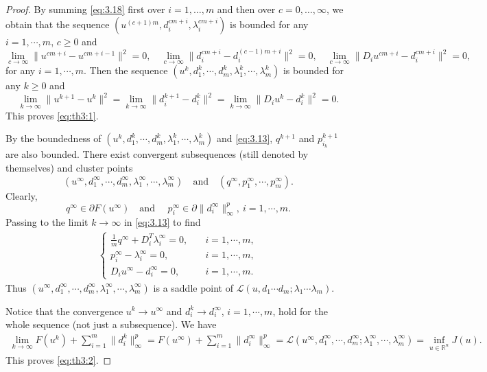 \documentclass{article}
\theoremstyle{definition}
\begin{document}
\begin{proof}
By summing \eqref{eq:3.18} first over $i = 1, \dots, m$ and then over $c = 0, \dots, \infty$,
we obtain that the sequence $(u^{(c+1)m}, d_i^{cm+i}, \lambda_i^{cm+i})$ is bounded for any $i=1,\cdots,m$, $c\geq 0$
and
\[
\lim_{c\rightarrow\infty}\|u^{cm+i}-u^{cm+i-1}\|^2=0,\quad
\lim_{c\rightarrow\infty}\|d_{i}^{cm+i}-d_{i}^{(c-1)m+i}\|^2=0,\quad
\lim_{c\rightarrow\infty}\|D_{i}u^{cm+i}-d_{i}^{cm+i}\|^2=0,
\]
for any $i=1,\cdots,m$.
Then the sequence $(u^k, d_1^k,\cdots, d_m^k,\lambda_1^k,\cdots,\lambda_m^k)$ is bounded for any $k\geq 0$ and
\[
\lim_{k\rightarrow\infty}\|u^{k+1}-u^{k}\|^2
    =\lim_{k\rightarrow\infty}\|d_i^{k+1}-d_i^{k}\|^2
    =\lim_{k\rightarrow\infty}\|D_iu^{k}-d_i^k\|^2
    =0.
\]
This proves \eqref{eq:th3:1}.

By the boundedness of $(u^k, d_1^k,\cdots, d_m^k,\lambda_1^k,\cdots,\lambda_m^k)$ and \eqref{eq:3.13}, $q^{k+1}$ and $p_{i_k}^{k+1}$ are also bounded.
There exist convergent subsequences (still denoted by themselves) and cluster points
\[
(u^\infty, d_1^\infty, \cdots, d_m^\infty, \lambda_1^\infty,\cdots,\lambda_m^\infty)\quad \mbox{and}\quad (q^\infty,p_1^\infty,\cdots,p_m^\infty).
\]
Clearly,
\[
q^\infty\in\partial F(u^\infty)\quad \mbox{and } \quad
p_i^\infty\in \partial \|d_i^\infty\|^p_\infty, ~i=1,\cdots, m.
\]
Passing to the limit $k\rightarrow\infty$ in \eqref{eq:3.13} to find
\begin{align*}
  \begin{cases}
    \frac{1}{m}q^\infty+D_i^T\lambda_i^\infty=0,\quad &i=1,\cdots, m, \\
    p_i^\infty-\lambda_i^\infty=0, \quad &i=1,\cdots, m,\\
    D_iu^\infty-d_i^\infty=0,\quad &i=1,\cdots, m.
  \end{cases}
\end{align*}
Thus $(u^\infty, d_1^\infty, \cdots, d_m^\infty, \lambda_1^\infty,\cdots,\lambda_m^\infty)$ is a saddle point of $\mathcal{L}(u,d_1\cdots d_m;\lambda_1\cdots \lambda_m)$.


Notice that the convergence $u^k\rightarrow u^\infty$ and $d_i^k\rightarrow d_i^\infty$, $i=1,\cdots,m$, hold for the whole sequence (not just a subsequence).
We have
\begin{align*}
\lim_{k\rightarrow\infty} F(u^k)+\sum_{i=1}^{m}\|d_i^{k}\|_\infty^p
=F(u^\infty)+\sum_{i=1}^{m}\|d_i^\infty\|_\infty^p
=\mathcal{L}(u^\infty, d_1^\infty, \cdots, d_m^\infty; \lambda_1^\infty,\cdots,\lambda_m^\infty)
=\inf_{u\in\mathbb{R}^n}J(u).
\end{align*}
This proves \eqref{eq:th3:2}.
\end{proof}
\end{document}
